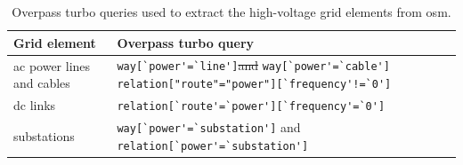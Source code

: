 \documentclass[fleqn,10pt]{wlscirep}
\newcommand{\colorcode}[1]{\colorbox{gray!20}{\lstinline|#1|}}
\providecommand{\DIFaddtex}[1]{{\protect\color{blue}\uwave{#1}}} %
\providecommand{\DIFdeltex}[1]{{\protect\color{red}\sout{#1}}}                      %
\providecommand{\DIFaddbegin}{} %
\providecommand{\DIFaddend}{} %
\providecommand{\DIFdelend}{} %
\providecommand{\DIFaddFL}[1]{\DIFadd{#1}} %
\providecommand{\DIFdelFL}[1]{\DIFdel{#1}} %
\providecommand{\DIFaddbeginFL}{} %
\providecommand{\DIFaddendFL}{} %
\providecommand{\DIFdelbeginFL}{} %
\providecommand{\DIFdelendFL}{} %
\providecommand{\DIFadd}[1]{\texorpdfstring{\DIFaddtex{#1}}{#1}} %
\providecommand{\DIFdel}[1]{\texorpdfstring{\DIFdeltex{#1}}{}} %
\begin{document}
\DIFdelend \DIFaddbegin {}
\DIFaddend 

\begin{table}[!htbp]
    \centering
    \begin{tabular}{|p{}|p{}|}
    \hline
    \textbf{Grid element} & \textbf{Overpass turbo query}  \\
    \hline
    \acrshort{ac} power lines and cables & \colorcode{way[`power'=`line']}\DIFdelbeginFL \DIFdelFL{and }\DIFdelendFL \DIFaddbeginFL \DIFaddFL{, }\DIFaddendFL \colorcode{way[`power'=`cable']} \DIFaddbeginFL \newline \DIFaddFL{and }\colorcode{relation["route"="power"][`frequency'!=`0']} \DIFaddendFL \\
    \hline
    \acrshort{dc} links & \colorcode{relation[`route'=`power'][`frequency'=`0']} \\
    \hline
    substations & \colorcode{way[`power'=`substation']} and \colorcode{relation[`power'=`substation']} \\
    \hline
    \end{tabular}
    \caption{Overpass turbo queries used to extract the high-voltage grid elements from \acrshort{osm}.}
    \label{tab:overpass_queries}
\end{table}
\end{document}
